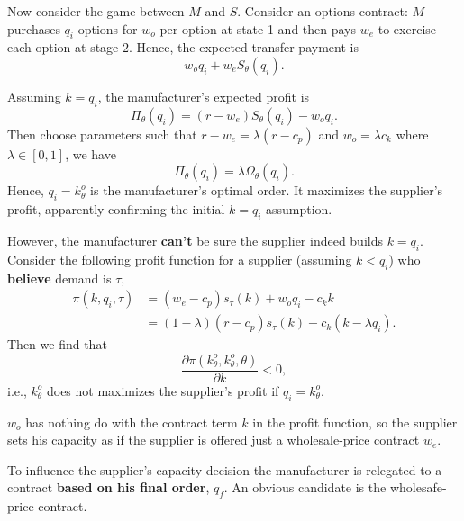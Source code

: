 Now consider the game between $M$ and $S$. Consider an options contract: $M$ purchases $q_i$ options for $w_o$ per option at state 1 and then pays $w_e$ to exercise each option at stage $2$. Hence, the expected transfer payment is 
\begin{equation*}
    w_o q_i+w_e S_\theta(q_i).
\end{equation*}

Assuming $k=q_i$, the manufacturer's expected profit is
\begin{equation*}
    \Pi_\theta(q_i)=(r-w_e)S_\theta(q_i)-w_o q_i.
\end{equation*}
Then choose parameters such that $r-w_e=\lambda(r-c_p)$ and $w_o=\lambda c_k$ where $\lambda\in[0,1]$, we have
\begin{equation*}
    \Pi_\theta(q_i)=\lambda\Omega_\theta(q_i).
\end{equation*}
Hence, $q_i=k_\theta^o$ is the manufacturer's optimal order. It maximizes the supplier's profit, apparently confirming the initial $k=q_i$ assumption.

However, the manufacturer \textbf{can't} be sure the supplier indeed builds $k=q_i$. Consider the following profit function for a supplier (assuming $k<q_i$) who \textbf{believe} demand is $\tau$,
\begin{align*}
    \pi(k,q_i,\tau)&=(w_e-c_p)s_\tau(k)+w_o q_i - c_k k\\
    &=(1-\lambda)(r-c_p)s_\tau(k)-c_k(k-\lambda q_i).
\end{align*}
Then we find that
$$\frac{\partial\pi(k_\theta^o,k_\theta^o,\theta)}{\partial k}<0,$$
i.e., $k_\theta^o$ does not maximizes the supplier's profit if $q_i=k_\theta^o$. 
\begin{note}
    $w_o$ has nothing do with the contract term $k$ in the profit function, so the supplier sets his capacity as if the supplier is offered just a wholesale-price contract $w_e$. 
\end{note}

To influence the supplier's capacity decision the manufacturer is relegated to a contract \textbf{based on his final order}, $q_f$. An obvious candidate is the wholesafe-price contract. 







